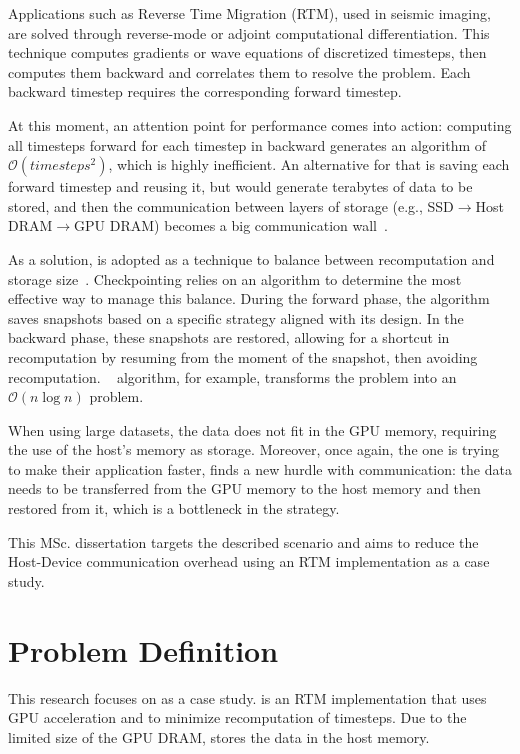 \documentclass[Ingles,Final]{ic-tese-v3}
\begin{document}
Applications such as Reverse Time Migration (RTM), used in seismic imaging, are solved through reverse-mode or adjoint computational differentiation. This technique computes gradients or wave equations of discretized timesteps, then computes them backward and correlates them to resolve the problem. Each backward timestep requires the corresponding forward timestep. 

At this moment, an attention point for performance comes into action: computing all timesteps forward for each timestep in backward generates an algorithm of $\mathcal{O}(\textit{timesteps}^2)$, which is highly inefficient. An alternative for that is saving each forward timestep and reusing it, but would generate terabytes of data to be stored, and then the communication between layers of storage (e.g., SSD$\rightarrow$Host DRAM$\rightarrow$GPU DRAM) becomes a big communication wall~\cite{symes2007}.

As a solution, \tit{\checkpointing} is adopted as a technique to balance between recomputation and storage size~\cite{symes2007}. Checkpointing relies on an algorithm to determine the most effective way to manage this balance. During the forward phase, the \checkpointing algorithm saves snapshots based on a specific strategy aligned with its design. In the backward phase, these snapshots are restored, allowing for a shortcut in recomputation by resuming from the moment of the snapshot, then avoiding recomputation. \revolve~\cite{revolve} \checkpointing algorithm, for example, transforms the problem into an $\mathcal{O}(n \log n)$ problem.

When using large datasets, the \checkpointing data does not fit in the GPU memory, requiring the use of the host's memory as storage. Moreover, once again, the one is trying to make their application faster, finds a new hurdle with communication: the data needs to be transferred from the GPU memory to the host memory and then restored from it, which is a bottleneck in the \checkpointing strategy.

This MSc. dissertation targets the described scenario and aims to reduce the Host-Device communication overhead using an RTM implementation as a case study.


\section{Problem Definition}
This research focuses on \awave as a case study. \awave is an RTM implementation that uses GPU acceleration and \checkpointing to minimize recomputation of timesteps. Due to the limited size of the GPU DRAM, \awave stores the \checkpointing data in the host memory.
\end{document}
